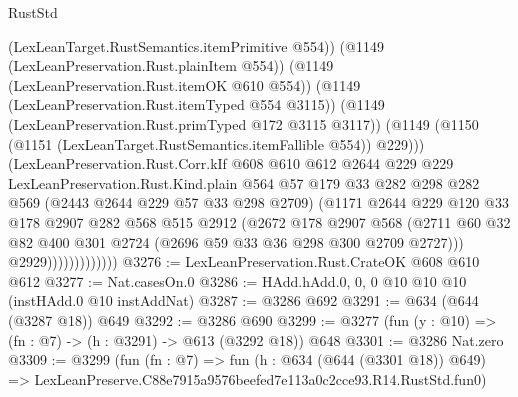 \begin{lexlean}{RustStd}
\begin{coremodule}
                              (LexLeanTarget.RustSemantics.itemPrimitive @554))
                            (@1149 (LexLeanPreservation.Rust.plainItem @554))
                            (@1149 (LexLeanPreservation.Rust.itemOK @610 @554))
                            (@1149 (LexLeanPreservation.Rust.itemTyped @554 @3115))
                            (@1149 (LexLeanPreservation.Rust.primTyped @172 @3115 @3117))
                            (@1149
                              (@1150 (@1151 (LexLeanTarget.RustSemantics.itemFallible @554)) @229)))
                          (LexLeanPreservation.Rust.Corr.kIf
                            @608
                            @610
                            @612
                            @2644
                            @229
                            @229
                            LexLeanPreservation.Rust.Kind.plain
                            @564
                            @57
                            @179
                            @33
                            @282
                            @298
                            @282
                            @569
                            (@2443 @2644 @229 @57 @33 @298 @2709)
                            (@1171
                              @2644
                              @229
                              @120
                              @33
                              @178
                              @2907
                              @282
                              @568
                              @515
                              @2912
                              (@2672
                                @178
                                @2907
                                @568
                                (@2711
                                  @60
                                  @32
                                  @82
                                  @400
                                  @301
                                  @2724
                                  (@2696 @59 @33 @36 @298 @300 @2709 @2727)))
                              @2929)))))))))))))
@3276 := LexLeanPreservation.Rust.CrateOK @608 @610 @612
@3277 := Nat.casesOn.{0}
@3286 := HAdd.hAdd.{0, 0, 0} @10 @10 @10 (instHAdd.{0} @10 instAddNat)
@3287 := @3286 @692
@3291 := @634 (@644 (@3287 @18)) @649
@3292 := @3286 @690
@3299 := @3277 (fun (y : @10) => (fn : @7) -> (h : @3291) -> @613 (@3292 @18)) @648
@3301 := @3286 Nat.zero
@3309 := @3299
    (fun (fn : @7) =>
    fun (h : @634 (@644 (@3301 @18)) @649) =>
    LexLeanPreserve.C88e7915a9576beefed7e113a0c2cce93.R14.RustStd.fun0)

\end{coremodule}
\end{lexlean}

